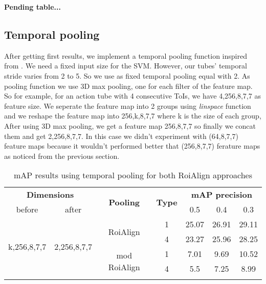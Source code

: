 


\textbf{Pending table...}
\\

\subsection{Temporal pooling}
After getting first results, we implement a temporal pooling function inspired from \cite{DBLP:journals/corr/HouCS17}. We need a
fixed input size for the SVM. However, our tubes' temporal stride varies from 2 to 5. So we use as fixed temporal pooling equal
with 2. As pooling function we use 3D max pooling, one for each filter of the feature map.  So for example, for an action tube
with 4 consecutive ToIs, we  have 4,256,8,7,7 as feature size. We seperate the feature map into 2 groups using \textit{linspace}
function and we reshape the feature map into 256,k,8,7,7 where k is the size of each group, After using 3D max pooling, we get
a feature map 256,8,7,7 so finally we concat them and get 2,256,8,7,7. In this case we didn't experiment with (64,8,7,7) feature
maps because it wouldn't performed better that (256,8,7,7) ferature maps as noticed from the previous section.

\begin{center}
\begin{longtable}{||c | c| c| c||c c c||}

  \hline
 \multicolumn{2}{||c|}{\textbf{Dimensions}} & \multirow{2}{*}{\textbf{Pooling}} &\multirow{2}{*}{ \textbf{Type}} &\multicolumn{3}{|c||}{\textbf{mAP precision}}\\

  before & after & {} & {} & 0.5 &  0.4 & 0.3\\
  \hline   \hline

  \multirow{4}{*}{k,256,8,7,7} & \multirow{4}{*}{2,256,8,7,7} & \multirow{2}{*}{RoiAlign}  & 1 & 25.07 & 26.91 & 29.11 \\
  \cline{4-7}
  {} & {} & {} & 4 &  23.27 & 25.96 & 28.25 \\
  \cline{3-7}
  {} & {} & \multirow{2}{*}{mod RoiAlign} & 1 & 7.01 & 9.69 & 10.52 \\
  \cline{4-7}
  {} & {} & {} & 4 & 5.5 & 7.25 & 8.99 \\
  \hline

  \caption{mAP results using temporal pooling for both RoiAlign approaches}
  \label{table:svm_temp_pooling}
\end{longtable} 
\end{center}


